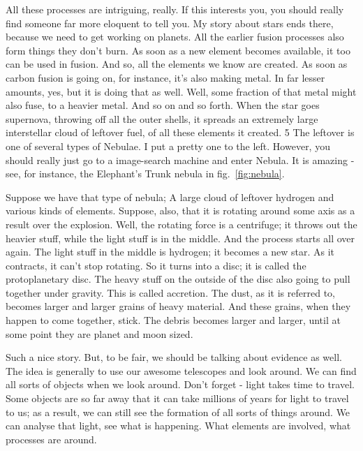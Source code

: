 \begin{multicols}{2}

All these processes are intriguing, really. If this interests you, you should really find someone far more eloquent to tell you. My story about stars ends there, because we need to get working on planets. All the earlier fusion processes also form things they don't burn. As soon as a new element becomes available, it too can be used in fusion. And so, all the elements we know are created. As soon as carbon fusion is going on, for instance, it's also making metal. In far lesser amounts, yes, but it is doing that as well. Well, some fraction of that metal might also fuse, to a heavier metal. And so on and so forth. When the star goes supernova, throwing off all the outer shells, it spreads an extremely large interstellar cloud of leftover fuel, of all these elements it created. 5 The leftover is one of several types of Nebulae. I put a pretty one to the left. However, you should really just go to a image-search machine and enter Nebula. It is amazing - see, for instance, the Elephant's Trunk nebula in fig.~\ref{fig:nebula}.

Suppose we have that type of nebula; A large cloud of leftover hydrogen and various kinds of elements. Suppose, also, that it is rotating around some axis as a result over the explosion. Well, the rotating force is a centrifuge; it throws out the heavier stuff, while the light stuff is in the middle. And the process starts all over again. The light stuff in the middle is hydrogen; it becomes a new star. As it contracts, it can't stop rotating. So it turns into a disc; it is called the protoplanetary disc. The heavy stuff on the outside of the disc also going to pull together under gravity. This is called accretion. The dust, as it is referred to, becomes larger and larger grains of heavy material. And these grains, when they happen to come together, stick. The debris becomes larger and larger, until at some point they are planet and moon sized.

Such a nice story. But, to be fair, we should be talking about evidence as well. The idea is generally to use our awesome telescopes and look around. We can find all sorts of objects when we look around. Don't forget - light takes time to travel. Some objects are so far away that it can take millions of years for light to travel to us; as a result, we can still see the formation of all sorts of things around. We can analyse that light, see what is happening. What elements are involved, what processes are around.


\end{multicols}
